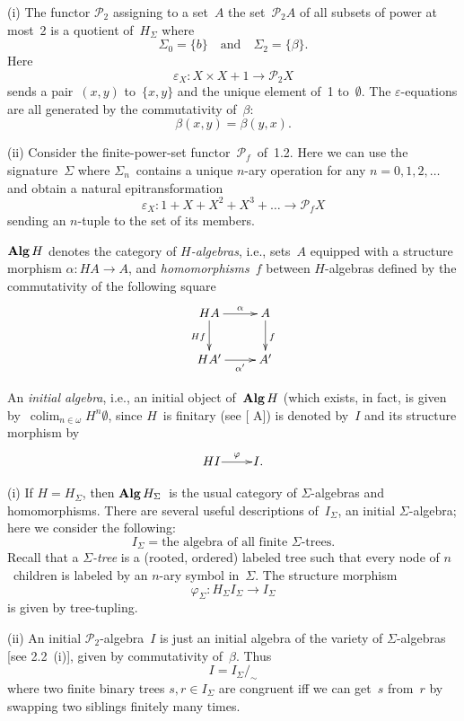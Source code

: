 \documentclass{entcs}
\newcommand{\Pf}{\ensuremath{\mathscr{P}_{\!\!f}}}
\newcommand{\PP}{\ensuremath{\mathscr{P}}}
\DeclareMathOperator{\Alg}{\textnormal{\textbf{Alg}}}
\DeclareMathOperator*{\colim}{colim}
\newenvironment{pv}[1]{\begin{trivlist}
\item[\hspace{\labelsep}\normalfont\bfseries#1]}%
{\end{trivlist}}
\begin{document}
\begin{pv}{2.2 Examples}
(i) The functor $\PP_{\!2}$ assigning to a set~$A$ the
set~$\PP_{\!2}A$ of all subsets of power at most~2 is a quotient
of~$H_\Sigma$ where
\[\Sigma_0=\{b\}\quad\text{and}\quad \Sigma_2=\{\beta\}.\]
Here
\[\varepsilon_X\colon X\times X+1\to\PP_{\!2}X\]
sends a pair~$(x,y)$ to~$\{x,y\}$ and the unique element of~1
to~$\emptyset$. The $\varepsilon$-equations are all generated by the
commutativity of~$\beta$:
\[\beta(x,y)=\beta(y,x).\]

(ii) Consider the finite-power-set functor~\Pf\ of~1.2. Here we can
use the signature~$\Sigma$ where $\Sigma_n$~contains a unique
$n$-ary operation for any $n=0,1,2,\dots$ and obtain a natural
epitransformation
\[\varepsilon_X\colon1+X+X^2+X^3+\dots\to\Pf X\]
sending an $n$-tuple to the set of its members.
\end{pv}

\begin{pv}{2.3 Notation}
$\Alg H$ denotes the category of \textit{$H$-algebras}, i.e.,
sets~$A$ equipped with a structure morphism $\alpha\colon HA\to A$,
and \textit{homomorphisms}~$f$ between $H$-al\-ge\-bras defined by the
commutativity of the following square\vspace{1mm}
\[                        %
\xy
\xymatrix{
HA
\ar[0,1]^-{\alpha}
\ar[1,0]_{Hf}
&
A
\ar[1,0]^{f}
\\
HA'
\ar[0,1]_-{\alpha'}
&
A'
}
\endxy
\]
\vspace{1mm}

\noindent
An \textit{initial algebra}, i.e., an initial object of~$\Alg H$
(which exists, in fact, is given by~$\colim_{n\in\omega} H^n\emptyset$,
since
$H$~is finitary (see [ A]) is denoted by~$I$ and its structure
morphism by
\[
\xy
\xymatrix@1{
HI
\ar[0,1]^-{\varphi}
&
I.
}
\endxy
\]
\end{pv}

\begin{pv}{2.4 Examples}
(i) If $H=H_\Sigma$, then $\Alg H_\Sigma$~is the usual
category of $\Sigma$-al\-ge\-bras and homomorphisms.
There are several
useful descriptions of~$I_\Sigma$, an initial $\Sigma$-al\-ge\-bra;
here we consider the following:
\[I_\Sigma=\text{the algebra of all finite $\Sigma$-trees.}\]
Recall that a \textit{$\Sigma$-tree} is a (rooted, ordered) labeled
tree such that every node of $n$~children is labeled by an $n$-ary
symbol in~$\Sigma$. The structure morphism
\[\varphi_\Sigma\colon H_\Sigma I_\Sigma\to I_\Sigma\]
is given by tree-tupling.

(ii) An initial $\PP_{\!2}$-algebra~$I$ is just an initial algebra
of the variety of $\Sigma$-al\-ge\-bras [see 2.2~(i)], given by
commutativity of~$\beta$. Thus
\[I=I_{\Sigma}/_\sim\]
where two finite binary trees $s,r\in I_{\Sigma}$ are congruent
iff we can get~$s$ from~$r$ by swapping two siblings
finitely many times.
\end{pv}
\end{document}
